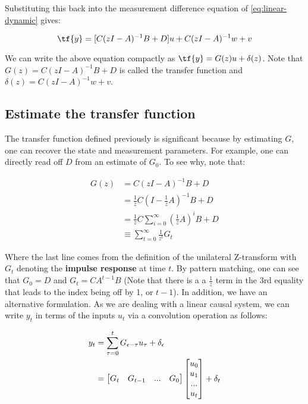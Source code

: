 \documentclass{article}[12pt]
\begin{document}
Substituting this back into the measurement difference equation of \eqref{eq:linear-dynamic} gives:

$$ \tf{y} = [C(zI - A)^{-1}B + D]u + C(zI-A)^{-1}w + v $$

We can write the above equation compactly as $\tf{y} = G(z)u + \delta(z)$. Note that $G(z) = C(zI - A)^{-1}B + D$ is called the transfer function and $\delta(z) = C(zI-A)^{-1}w + v$.

\subsection{Estimate the transfer function}

The transfer function defined previously is significant because by estimating $G$, one can recover the state and measurement parameters. For example, one can directly read off $D$ from an estimate of $G_0$. To see why, note that:

\begin{align*}
    G(z) &= C(zI-A)^{-1}B+D\\
    &= \frac{1}{z}C(I-\frac{1}{z}A)^{-1}B + D\\
    &= \frac{1}{z}C\sum_{i=0}^\infty (\frac{1}{z}A)^i B+D\\
    &\equiv \sum_{t=0}^\infty \frac{1}{z^t}G_t
\end{align*}

Where the last line comes from the definition of the unilateral Z-transform with $G_t$ denoting the \textbf{impulse response} at time $t$. By pattern matching, one can see that $G_0 = D$ and $G_t = CA^{t-1}B$ (Note that there is a a $\frac{1}{z}$ term in the 3rd equality that leads to the index being off by 1, or $t-1$). In addition, we have an alternative formulation. As we are dealing with a linear causal system, we can write $y_t$ in terms of the inputs $u_t$ via a convolution operation as follows:

\begin{align}
    y_t &= \sum_{\tau = 0}^t G_{\epsilon-\tau}u_\tau + \delta_\epsilon\notag\\
    &= \begin{bmatrix}
        G_t &G_{t-1} &... &G_0
    \end{bmatrix}\begin{bmatrix}u_0\\u_1\\...\\u_t \end{bmatrix} + \delta_t\label{eq:convolution-vector}\\
    \notag
\end{align}
\end{document}
